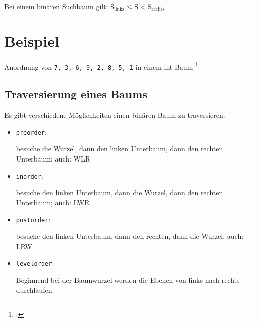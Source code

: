 \documentclass{bschlangaul-theorie}
\begin{document}
Bei einem binären Suchbaum gilt:
$\text{S}_\text{links} \leq \text{S} < \text{S}_\text{rechts}$

\section{Beispiel}

Anordnung von \verb|7, 3, 6, 9, 2, 8, 5, 1| in einem int-Baum
\footcite[Seite 5]{aud:fs:5}

\begin{center}
\end{center}

%

\subsection{Traversierung eines Baums}

Es gibt verschiedene Möglichkeiten einen binären Baum zu
traversieren:

\begin{itemize}
\item \texttt{preorder}:

besuche die Wurzel, dann den linken Unterbaum, dann den rechten
Unterbaum; auch: WLR


\item \texttt{inorder}:

besuche den linken Unterbaum, dann die Wurzel, dann den rechten
Unterbaum;
auch: LWR


\item \texttt{postorder}:

besuche den linken Unterbaum, dann den rechten, dann die Wurzel;
auch: LRW


\item \texttt{levelorder}:

Beginnend bei der Baumwurzel werden die
Ebenen von links nach rechts durchlaufen.


\end{itemize}
\end{document}
